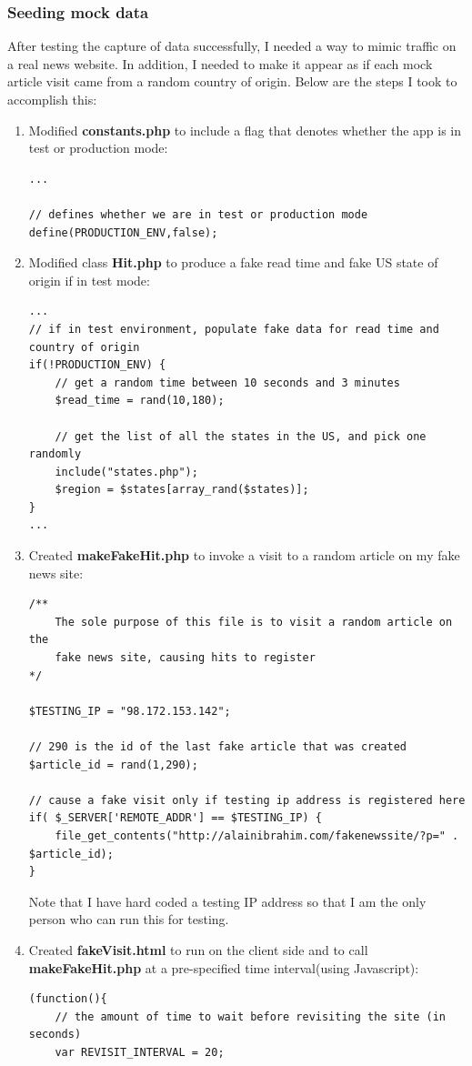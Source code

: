 \documentclass[12pt]{article}
\begin{document}
\subsubsection{Seeding mock data}
After testing the capture of data successfully, I needed a way to mimic traffic on a real news website. In addition, I needed to make it appear as if each mock article visit came from a random country of origin. Below are the steps I took to accomplish this:

\begin{enumerate}
\item{Modified \textbf{constants.php} to include a flag that denotes whether the app is in test or production mode:}
\begin{lstlisting}[basicstyle=\scriptsize]
...

// defines whether we are in test or production mode
define(PRODUCTION_ENV,false);
\end{lstlisting}

\item{Modified class \textbf{Hit.php} to produce a fake read time and fake US state of origin if in test mode:}
\begin{lstlisting}[basicstyle=\scriptsize]
...
// if in test environment, populate fake data for read time and country of origin
if(!PRODUCTION_ENV) {
	// get a random time between 10 seconds and 3 minutes
	$read_time = rand(10,180);
	
	// get the list of all the states in the US, and pick one randomly
	include("states.php");
	$region = $states[array_rand($states)];
}
...
\end{lstlisting}
\item{Created \textbf{makeFakeHit.php} to invoke a visit to a random article on my fake news site:}
\begin{lstlisting}[basicstyle=\scriptsize]
/**
	The sole purpose of this file is to visit a random article on the 
	fake news site, causing hits to register
*/

$TESTING_IP = "98.172.153.142";

// 290 is the id of the last fake article that was created
$article_id = rand(1,290);

// cause a fake visit only if testing ip address is registered here
if( $_SERVER['REMOTE_ADDR'] == $TESTING_IP) {
	file_get_contents("http://alainibrahim.com/fakenewssite/?p=" . $article_id);
}
\end{lstlisting}
Note that I have hard coded a testing IP address so that I am the only person who can run this for testing.
\item{Created \textbf{fakeVisit.html} to run on the client side and to call \textbf{makeFakeHit.php} at a pre-specified time interval(using Javascript):}
\begin{lstlisting}[basicstyle=\scriptsize]
(function(){
	// the amount of time to wait before revisiting the site (in seconds)
	var REVISIT_INTERVAL = 20;


\end{lstlisting}
\end{enumerate}
\end{document}

